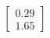 \documentclass[preview]{standalone}
\begin{document}
\begin{align*}
\begin{bmatrix} 0.29 \\ 1.65 \end{bmatrix}
\end{align*}
\end{document}
